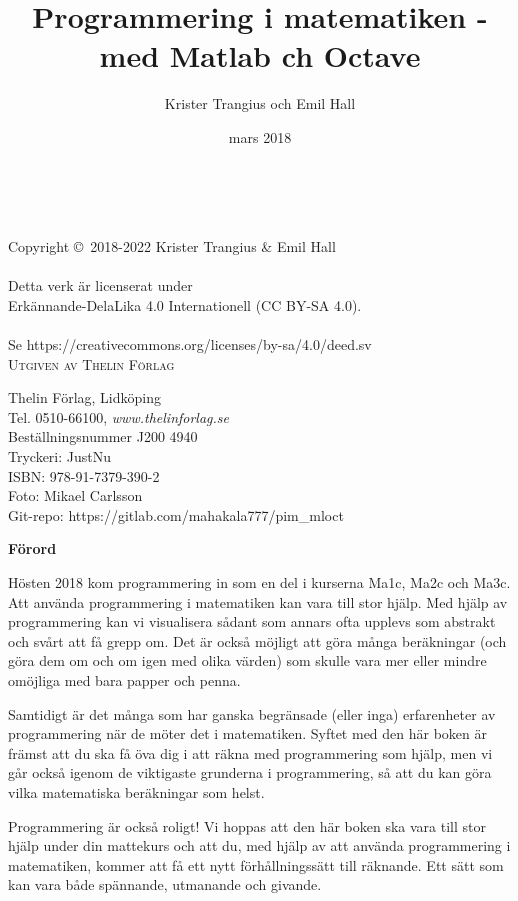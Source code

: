 \documentclass[14pt]{extbook}
\title{Programmering i matematiken - med Matlab ch Octave}
\author{Krister Trangius och Emil Hall}
\date{mars 2018}
\begin{document}
\newpage
~\vfill
\thispagestyle{empty}

\noindent Copyright \copyright\ 2018-2022 Krister Trangius \&  Emil Hall\\ %
\\
Detta verk är licenserat under\\
Erkännande-DelaLika 4.0 Internationell (CC BY-SA 4.0).\\
\\
Se https://creativecommons.org/licenses/by-sa/4.0/deed.sv\\

\noindent \textsc{Utgiven av Thelin Förlag} %

Thelin Förlag, Lidköping\\
Tel. 0510-66100, \emph{www.thelinforlag.se}\\
Beställningsnummer J200 4940\\
Tryckeri: JustNu\\
ISBN: 978-91-7379-390-2\\
Foto: Mikael Carlsson\\
Git-repo: https://gitlab.com/mahakala777/pim_mloct
\newpage

\newpage
\thispagestyle{empty}
{\Large{\textbf{Förord}}}

Hösten 2018 kom programmering in som en del i kurserna Ma1c, Ma2c och Ma3c. Att använda programmering i matematiken kan vara till stor hjälp. Med hjälp av programmering kan vi visualisera sådant som annars ofta upplevs som abstrakt och svårt att få grepp om. Det är också möjligt att göra många beräkningar (och göra dem om och om igen med olika värden) som skulle vara mer eller mindre omöjliga med bara papper och penna.

Samtidigt är det många som har ganska begränsade (eller inga) erfarenheter av programmering när de möter det i matematiken. Syftet med den här boken är främst att du ska få öva dig i att räkna med programmering som hjälp, men vi går också igenom de viktigaste grunderna i programmering, så att du kan göra  vilka matematiska beräkningar som helst.

Programmering är också roligt! Vi hoppas att den här boken ska vara till stor hjälp under din mattekurs och att du, med hjälp av att använda programmering i matematiken, kommer att få ett nytt förhållningssätt till räknande. Ett sätt som kan vara både spännande, utmanande och givande. 
\end{document}
